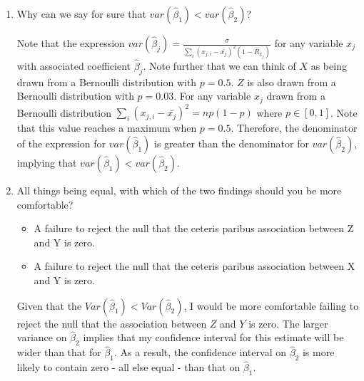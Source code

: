\documentclass[12pt]{article}
\begin{document}
\begin{enumerate}
\vspace{4mm} 

\item Why can we say for sure that $var(\hat{\beta}_1) < var(\hat{\beta}_2)$?

Note that the expression $var(\hat{\beta}_j) = \frac{\sigma}{\sum_i (x_{j,i} - \bar{x_j})^2 (1-R_{x_j})}$ for any variable $x_j$ with associated coefficient $\hat{\beta}_j$.  Note further that we can think of $X$ as being drawn from a Bernoulli distribution with $p=0.5$.  $Z$ is also drawn from a Bernoulli distribution with $p=0.03$.  For any variable $x_j$ drawn from a Bernoulli distribution $\sum_i (x_{j,i}-\bar{x_j})^2 = np(1-p)$ where $p \in [0,1]$.  Note that this value reaches a maximum when $p=0.5$.  Therefore, the denominator of the expression for $var(\hat{\beta}_1)$ is greater than the denominator for $var(\hat{\beta}_2)$, implying that $var(\hat{\beta}_1) < var(\hat{\beta}_2)$.
\item All things being equal, with which of the two findings should you be more comfortable?
\begin{itemize}
\item A failure to reject the null that the ceteris paribus association between Z and Y is
zero.
\item A failure to reject the null that the ceteris paribus association between X and Y is
zero.
\end{itemize}

\vspace{4mm} 

Given that the $Var(\hat{\beta}_1)<Var(\hat{\beta}_2)$, I would be more comfortable failing to reject the null that the association between $Z$ and $Y$ is zero.  The larger variance on $\hat{\beta}_2$ implies that my confidence interval for this estimate will be wider than that for $\hat{\beta}_1$.  As a result, the confidence interval on $\hat{\beta}_2$ is more likely to contain zero - all else equal - than that on $\hat{\beta}_1$.
\end{enumerate}
\end{document}
